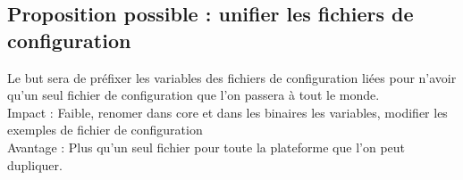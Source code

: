 \documentclass{article}
\begin{document}
\subsection{Proposition possible : unifier les fichiers de configuration}
Le but sera de préfixer les variables des fichiers de configuration liées pour n'avoir
qu'un seul fichier de configuration que l'on passera à tout le monde.\\
Impact : Faible, renomer dans core et dans les binaires les variables, 
modifier les exemples de fichier de configuration \\
Avantage : Plus qu'un seul fichier pour toute la plateforme que l'on peut dupliquer.

\clearpage
%
%
    
\end{document}
